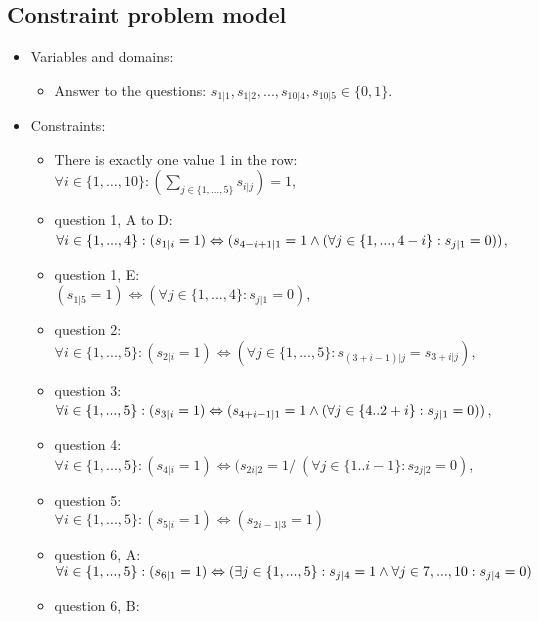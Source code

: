\subsection{Constraint problem model}
	\begin{itemize}
  \item Variables and domains: 
    \begin{itemize}
      \item Answer to the questions: $s_{1|1}, s_{1|2}, ..., s_{10|4}, s_{10|5} \in \{0, 1\}$.
    \end{itemize}
	\item Constraints:
	 \begin{itemize}
    \item There is exactly one value 1 in the row: \\
      $\forall i \in \{1, \ldots, 10\}: \left(\sum_{j \in \{1, ..., 5\}}{s_{i|j}}\right) = 1$,
    \item question 1, A to D: \\
      $\forall i \in \{1,...,4\}: (s_{1|i} = 1) \Leftrightarrow (s_{4-i+1|1} = 1 \wedge (\forall j \in \{1,...,4-i\}: s_{j|1} = 0))$,
    \item question 1, E: \\
      $(s_{1|5} = 1) \Leftrightarrow (\forall j \in \{1,...,4\}: s_{j|1} = 0)$,
    \item question 2: \\
      $\forall i \in \{1,...,5\}: (s_{2|i} = 1) \Leftrightarrow (\forall j \in \{1,...,5\}: s_{(3+i-1)|j} = s_{3+i|j})$,
    \item question 3: \\
      $\forall i \in \{1,...,5\}: (s_{3|i} = 1) \Leftrightarrow (s_{4+i-1|1} = 1 \wedge (\forall j \in \{4..2+i\}: s_{j|1} = 0 ) )$,
    \item question 4: \\
      $\forall i \in \{1,...,5\}: (s_{4|i} = 1) \Leftrightarrow (s_{2i|2} = 1 /\ ( \forall j \in \{1..i-1\}: s_{2j|2} = 0 )$,
    \item question 5: \\
      $\forall i \in \{1,...,5\}: (s_{5|i} = 1) \Leftrightarrow (s_{2i-1|3}=1)$
    \item question 6, A: \\
      $\forall i \in \{1,...,5\}: (s_{6|1} = 1) \Leftrightarrow (\exists j \in \{1,...,5\}: s_{j|4} = 1 \wedge \forall j \in {7,...,10}: s_{j|4} = 0)$
    \item question 6, B: \\

\end{itemize}
\end{itemize}
